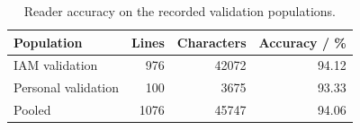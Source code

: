 \begin{table}[!htbp]\centering\small
\begin{tabular}{lrrr}
\toprule Population & Lines & Characters & Accuracy / \%\\\midrule
IAM validation & 976 & 42072 & 94.12\\
Personal validation & 100 & 3675 & 93.33\\
Pooled & 1076 & 45747 & 94.06\\
\bottomrule\end{tabular}
\caption{Reader accuracy on the recorded validation populations.}\label{tab:res-r2-reader}\end{table}
